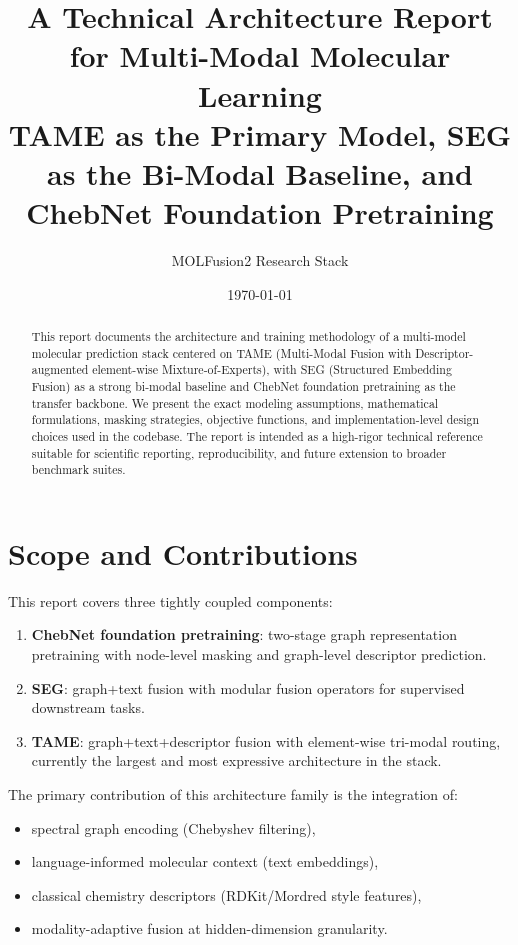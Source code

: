 \documentclass[11pt,a4paper]{article}
\title{\textbf{A Technical Architecture Report for Multi-Modal Molecular Learning}\\
\large TAME as the Primary Model, SEG as the Bi-Modal Baseline, and ChebNet Foundation Pretraining}
\author{MOLFusion2 Research Stack}
\date{\today}
\begin{document}
\maketitle

\begin{abstract}
This report documents the architecture and training methodology of a multi-model molecular prediction stack centered on TAME (Multi-Modal Fusion with Descriptor-augmented element-wise Mixture-of-Experts), with SEG (Structured Embedding Fusion) as a strong bi-modal baseline and ChebNet foundation pretraining as the transfer backbone. We present the exact modeling assumptions, mathematical formulations, masking strategies, objective functions, and implementation-level design choices used in the codebase. The report is intended as a high-rigor technical reference suitable for scientific reporting, reproducibility, and future extension to broader benchmark suites.
\end{abstract}

\tableofcontents

\section{Scope and Contributions}
This report covers three tightly coupled components:
\begin{enumerate}[label=\arabic*.]
    \item \textbf{ChebNet foundation pretraining}: two-stage graph representation pretraining with node-level masking and graph-level descriptor prediction.
    \item \textbf{SEG}: graph+text fusion with modular fusion operators for supervised downstream tasks.
    \item \textbf{TAME}: graph+text+descriptor fusion with element-wise tri-modal routing, currently the largest and most expressive architecture in the stack.
\end{enumerate}

The primary contribution of this architecture family is the integration of:
\begin{itemize}
    \item spectral graph encoding (Chebyshev filtering),
    \item language-informed molecular context (text embeddings),
    \item classical chemistry descriptors (RDKit/Mordred style features),
    \item modality-adaptive fusion at hidden-dimension granularity.
\end{itemize}
\end{document}
